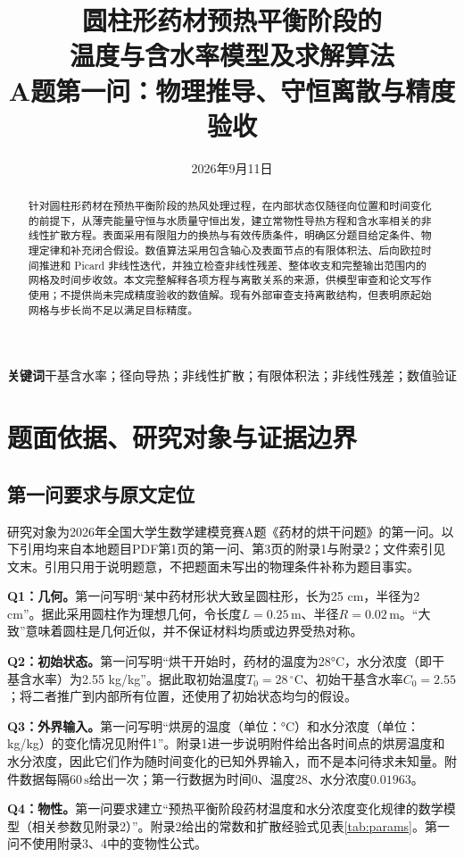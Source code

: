 \documentclass[UTF8,a4paper,zihao=-4,fontset=none]{ctexart}
\title{\bfseries 圆柱形药材预热平衡阶段的\\温度与含水率模型及求解算法\\[0.5em]\large A题第一问：物理推导、守恒离散与精度验收}
\author{}
\date{2026年9月11日}
\numberwithin{equation}{section}
\newcommand{\units}[1]{\,\mathrm{#1}}
\begin{document}
\maketitle
\begin{abstract}
针对圆柱形药材在预热平衡阶段的热风处理过程，在内部状态仅随径向位置和时间变化的前提下，从薄壳能量守恒与水质量守恒出发，建立常物性导热方程和含水率相关的非线性扩散方程。表面采用有限阻力的换热与有效传质条件，明确区分题目给定条件、物理定律和补充闭合假设。数值算法采用包含轴心及表面节点的有限体积法、后向欧拉时间推进和 Picard 非线性迭代，并独立检查非线性残差、整体收支和完整输出范围内的网格及时间步收敛。本文完整解释各项方程与离散关系的来源，供模型审查和论文写作使用；不提供尚未完成精度验收的数值解。现有外部审查支持离散结构，但表明原起始网格与步长尚不足以满足目标精度。
\end{abstract}
\noindent\textbf{关键词}\quad 干基含水率；径向导热；非线性扩散；有限体积法；非线性残差；数值验证
\clearpage
{\fontsize{9.2}{9.7}\selectfont\tableofcontents}
\clearpage

\section{题面依据、研究对象与证据边界}
\subsection{第一问要求与原文定位}
研究对象为2026年全国大学生数学建模竞赛A题《药材的烘干问题》的第一问。以下引用均来自本地题目PDF第1页的第一问、第3页的附录1与附录2；文件索引见文末。引用只用于说明题意，不把题面未写出的物理条件补称为题目事实。

\textbf{Q1：几何。}第一问写明“某中药材形状大致呈圆柱形，长为25 cm，半径为2 cm”。据此采用圆柱作为理想几何，令长度$L=0.25\units m$、半径$R=0.02\units m$。“大致”意味着圆柱是几何近似，并不保证材料均质或边界受热对称。

\textbf{Q2：初始状态。}第一问写明“烘干开始时，药材的温度为28°C，水分浓度（即干基含水率）为2.55 kg/kg”。据此取初始温度$T_0=28\,^\circ\mathrm C$、初始干基含水率$C_0=2.55$；将二者推广到内部所有位置，还使用了初始状态均匀的假设。

\textbf{Q3：外界输入。}第一问写明“烘房的温度（单位：°C）和水分浓度（单位：kg/kg）的变化情况见附件1”。附录1进一步说明附件给出各时间点的烘房温度和水分浓度，因此它们作为随时间变化的已知外界输入，而不是本问待求未知量。附件数据每隔$60\units s$给出一次；第一行数据为时间$0$、温度$28$、水分浓度$0.01963$。

\textbf{Q4：物性。}第一问要求建立“预热平衡阶段药材温度和水分浓度变化规律的数学模型（相关参数见附录2）”。附录2给出的常数和扩散经验式见表\ref{tab:params}。第一问不使用附录3、4中的变物性公式。
\end{document}
